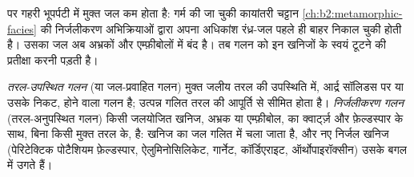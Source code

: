 \begin{omfigure}
\centering
{}
\par{}
\end{omfigure}

पर गहरी भूपर्पटी में मुक्त जल कम होता है: गर्म की जा चुकी कायांतरी चट्टान
\cref{ch:b2:metamorphic-facies} की निर्जलीकरण अभिक्रियाओं द्वारा अपना अधिकांश रंध्र-जल पहले ही
बाहर निकाल चुकी होती है। उसका जल अब अभ्रकों और एम्फ़ीबोलों में बंद है। तब गलन को
इन खनिजों के स्वयं टूटने की प्रतीक्षा करनी पड़ती है।

\begin{definition}\label{def:b2:crustal-melting:reactions}
\emph{तरल-उपस्थित गलन} (या जल-प्रवाहित गलन) मुक्त जलीय तरल की
उपस्थिति में, आर्द्र सॉलिडस पर या उसके निकट, होने वाला गलन है; उत्पन्न गलित
तरल की आपूर्ति से सीमित होता है। \emph{निर्जलीकरण गलन}
(तरल-अनुपस्थित गलन) किसी जलयोजित खनिज, अभ्रक या
एम्फ़ीबोल, का क्वार्ट्ज़ और फ़ेल्डस्पार के साथ, बिना किसी मुक्त तरल के,  है: खनिज का जल
गलित में चला जाता है, और नए निर्जल खनिज (पेरिटेक्टिक पोटैशियम फ़ेल्डस्पार, ऐलुमिनोसिलिकेट,
गार्नेट, कॉर्डिएराइट, ऑर्थोपाइरॉक्सीन) उसके बगल में उगते हैं।
\end{definition}

